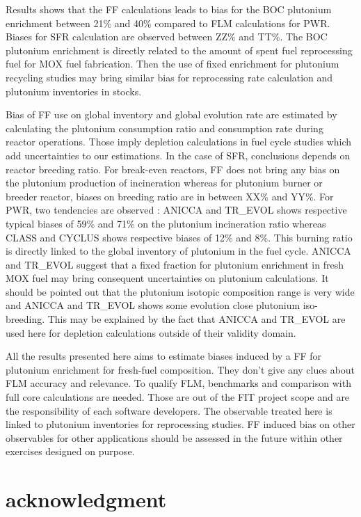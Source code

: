 Results shows that the FF calculations leads to bias for the BOC plutonium
enrichment between 21\% and 40\% compared to FLM calculations for PWR. Biases
for SFR calculation are observed between ZZ\% and TT\%. The BOC plutonium
enrichment is directly related to the amount of spent fuel reprocessing fuel for
MOX fuel fabrication. Then the use of fixed enrichment for plutonium recycling
studies may bring similar bias for reprocessing rate calculation and plutonium
inventories in stocks. 

Bias of FF use on global inventory and global evolution rate are estimated by
calculating the plutonium consumption ratio and consumption rate during reactor
operations. Those imply depletion calculations in fuel cycle studies which add
uncertainties to our estimations. In the case of SFR, conclusions depends on
reactor breeding ratio. For break-even reactors, FF does not bring any bias on
the plutonium production of incineration whereas for plutonium burner or breeder
reactor, biases on breeding ratio are in between XX\% and YY\%. For PWR, two
tendencies are observed : ANICCA and TR\_EVOL shows respective typical biases of
59\% and 71\% on the plutonium incineration ratio whereas CLASS and CYCLUS shows
respective biases of 12\% and 8\%. This burning ratio is directly linked to the
global inventory of plutonium in the fuel cycle. ANICCA and TR\_EVOL suggest
that a fixed fraction for plutonium enrichment in fresh MOX fuel may bring
consequent uncertainties on plutonium calculations. It should be pointed out
that the plutonium isotopic composition range is very wide and ANICCA and
TR\_EVOL shows some evolution close plutonium iso-breeding. This may be
explained by the fact that ANICCA and TR\_EVOL are used here for depletion
calculations outside of their validity domain.        

All the results presented here aims to estimate biases induced by a FF for
plutonium enrichment for fresh-fuel composition. They don't give any clues about
FLM accuracy and relevance. To qualify FLM, benchmarks and comparison with full
core calculations are needed. Those are out of the FIT project scope and are the
responsibility of each software developers. The observable treated here is
linked to plutonium inventories for reprocessing studies. FF induced bias on
other observables for other applications should be assessed in the future within
other exercises designed on purpose.   

\section{acknowledgment}

